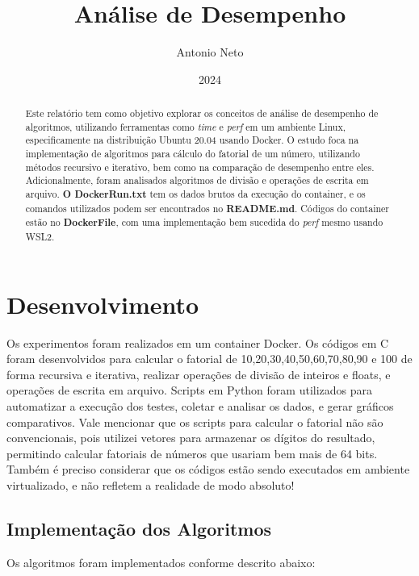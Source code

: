 \documentclass[12pt]{article}
\title{Análise de Desempenho}
\author{Antonio Neto}
\date{2024}
\begin{document}
\maketitle

\begin{abstract}
 Este relatório tem como objetivo explorar os conceitos de análise de desempenho de algoritmos, utilizando ferramentas como \textit{time} e \textit{perf} em um ambiente Linux, especificamente na distribuição Ubuntu 20.04 usando Docker. O estudo foca na implementação de algoritmos para cálculo do fatorial de um número, utilizando métodos recursivo e iterativo, bem como na comparação de desempenho entre eles. Adicionalmente, foram analisados algoritmos de divisão e operações de escrita em arquivo. \textbf{O DockerRun.txt} tem os dados brutos da execução do container, e os comandos utilizados podem ser encontrados no  \textbf{README.md}. Códigos do container estão no \textbf{DockerFile}, com uma implementação bem sucedida do \textit{perf} mesmo usando WSL2.
\end{abstract}

\tableofcontents

\newpage

\section{Desenvolvimento}
Os experimentos foram realizados em um container Docker. Os códigos em C foram desenvolvidos para calcular o fatorial de 10,20,30,40,50,60,70,80,90 e 100 de forma recursiva e iterativa, realizar operações de divisão de inteiros e floats, e operações de escrita em arquivo. Scripts em Python foram utilizados para automatizar a execução dos testes, coletar e analisar os dados, e gerar gráficos comparativos. Vale mencionar que os scripts para calcular o fatorial não são convencionais, pois utilizei vetores para armazenar os dígitos do resultado, permitindo calcular fatoriais de números que usariam bem mais de 64 bits. Também é preciso considerar que os códigos estão sendo executados em ambiente virtualizado, e não refletem a realidade de modo absoluto!

\subsection{Implementação dos Algoritmos}
Os algoritmos foram implementados conforme descrito abaixo:
\end{document}
